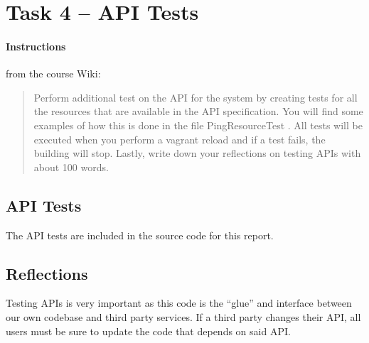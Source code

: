 %
%
%
%


\section{Task 4 -- API Tests}

\paragraph{Instructions}\label{task-4-instructions}
from the course Wiki\cite{1dv600:lab3:instructions}:

\begin{quote}
  Perform additional test on the API for the system by creating tests for all
  the resources that are available in the API specification. You will find some
  examples of how this is done in the file PingResourceTest . All tests will be
  executed when you perform a vagrant reload and if a test fails, the building
  will stop. Lastly, write down your reflections on testing APIs with about 100
  words.
\end{quote}



\subsection{API Tests}\label{task-4}
The API tests are included in the source code for this report.


\subsection{Reflections}\label{task-4-reflect}
Testing APIs is very important as this code is the ``glue'' and interface
between our own codebase and third party services. If a third party changes
their API, all users must be sure to update the code that depends on said API.

